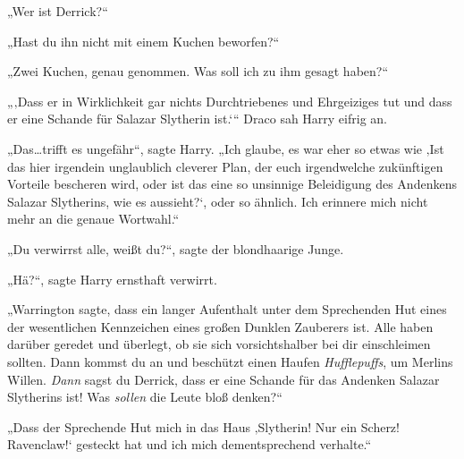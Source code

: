 „Wer ist Derrick?“

„Hast du ihn nicht mit einem Kuchen beworfen?“

„Zwei Kuchen, genau genommen. Was soll ich zu ihm gesagt haben?“

„‚Dass er in Wirklichkeit gar nichts Durchtriebenes und Ehrgeiziges tut und dass er eine Schande für Salazar Slytherin ist.‘“ Draco sah Harry eifrig an.

„Das…trifft es ungefähr“, sagte Harry. „Ich glaube, es war eher so etwas wie ‚Ist das hier irgendein unglaublich cleverer Plan, der euch irgendwelche zukünftigen Vorteile bescheren wird, oder ist das eine so unsinnige Beleidigung des Andenkens Salazar Slytherins, wie es aussieht?‘, oder so ähnlich. Ich erinnere mich nicht mehr an die genaue Wortwahl.“

„Du verwirrst alle, weißt du?“, sagte der blondhaarige Junge.

„Hä?“, sagte Harry ernsthaft verwirrt.

„Warrington sagte, dass ein langer Aufenthalt unter dem Sprechenden Hut eines der wesentlichen Kennzeichen eines großen Dunklen Zauberers ist. Alle haben darüber geredet und überlegt, ob sie sich vorsichtshalber bei dir einschleimen sollten. Dann kommst du an und beschützt einen Haufen \emph{Hufflepuffs}, um Merlins Willen. \emph{Dann} sagst du Derrick, dass er eine Schande für das Andenken Salazar Slytherins ist! Was \emph{sollen} die Leute bloß denken?“

„Dass der Sprechende Hut mich in das Haus ‚Slytherin! Nur ein Scherz! Ravenclaw!‘ gesteckt hat und ich mich dementsprechend verhalte.“


